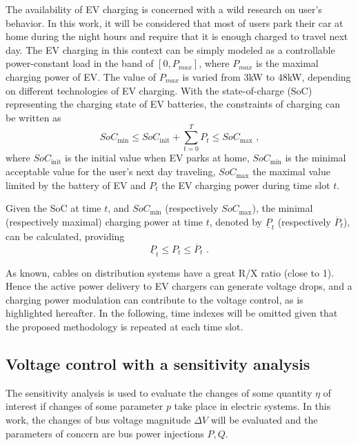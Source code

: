\documentclass[journal]{IEEEtran}
\begin{document}
The availability of EV charging is concerned with a wild research on user's behavior. In this work, it will be considered that most of users park their car at home during the night hours and require that it is enough charged to travel next day.  The EV charging in this context can be simply modeled as a controllable power-constant load in the band of $[0, P_{max}]$, where $P_{max}$ is the maximal charging power of EV. The value of $P_{max}$ is varied from $3$kW to $48$kW, depending on different technologies of EV charging. With the state-of-charge (SoC) representing the charging state of EV batteries, the constraints of charging can be written as
\begin{equation}
 SoC_{\textrm{min}} \leq SoC_{\textrm{init}}+\sum_{t=0}^{T}P_{t} \leq SoC_{\textrm{max}} \text{ ,}
\end{equation}
where $SoC_{\textrm{init}}$ is the initial value when EV parks at home, $SoC_{\textrm{min}}$ is the minimal acceptable value for the user's next day traveling, $SoC_{\textrm{max}}$ the maximal value limited by the battery of EV and $P_{t}$ the EV charging power during time slot $t$.

Given the SoC at time $t$, and $SoC_{\textrm{min}}$ (respectively $SoC_{\textrm{max}}$), the minimal (respectively maximal) charging power at time $t$, denoted by $\underline{P}_{t}$ (respectively $\overline{P}_{t}$), can be calculated, providing  
\begin{equation}
 \underline{P}_{t} \leq  P_{t} \leq  \overline{P}_{t} \text{ .}
\end{equation}

As known, cables on distribution systems have a great R/X ratio (close to 1).  Hence the active power delivery to EV chargers can generate voltage drops, and a charging power modulation can contribute to the voltage control, as is highlighted hereafter. In the following, time indexes will be omitted given that the proposed methodology is repeated at each time slot.

\subsection{Voltage control with a sensitivity analysis}


The sensitivity analysis \cite{VanCutsem1998} is used to evaluate the changes of some quantity $\eta$ of interest if changes of some parameter $p$ take place in electric systems. In this work, the changes of bus voltage magnitude $\Delta V$ will be evaluated and the parameters of concern are bus power injections $P,Q$.
\end{document}
